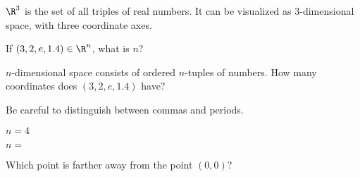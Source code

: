 \documentclass{ximera}
\begin{document}

\begin{example}
	$\R^3$ is the set of all triples of real numbers.  It can be visualized as $3$-dimensional space, with three coordinate axes. 
	
\end{example}


\begin{question}
  If $(3,2,e,1.4) \in \R^n$, what is $n$?
  \begin{solution}
    \begin{hint}
      $n$-dimensional space consists of ordered $n$-tuples of numbers.  How many coordinates does $(3,2,e,1.4)$ have?
    \end{hint}
    \begin{hint}
      \begin{warning}
        Be careful to distinguish between commas and periods.
      \end{warning}
    \end{hint}
    \begin{hint}
    	$n=4$
    \end{hint}
    $n = $ 
  \end{solution}
\end{question}

\begin{question}
  Which point is farther away from the point $(0,0)$?

  \begin{solution}
    \begin{hint}
    \end{hint}

    \begin{multiple-choice}
    \end{multiple-choice}    
  \end{solution}
\end{question}
\end{document}
